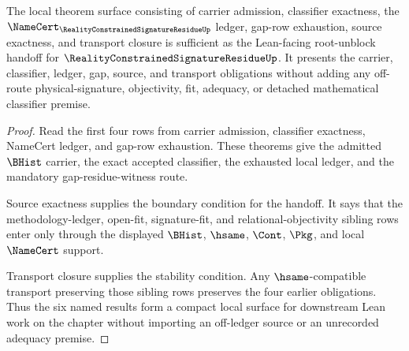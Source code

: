 \begin{theorem}
\label{thm:reality-constrained-signature-residue-lean-unblock-surface}
The local theorem surface consisting of carrier admission, classifier exactness,
the $\NameCert_{\RealityConstrainedSignatureResidueUp}$ ledger, gap-row
exhaustion, source exactness, and transport closure is sufficient as the
Lean-facing root-unblock handoff for
$\RealityConstrainedSignatureResidueUp$. It presents the carrier, classifier,
ledger, gap, source, and transport obligations without adding any off-route
physical-signature, objectivity, fit, adequacy, or detached mathematical
classifier premise.
\end{theorem}
\begin{proof}
Read the first four rows from carrier admission, classifier exactness, NameCert
ledger, and gap-row exhaustion. These theorems give the admitted $\BHist$
carrier, the exact accepted classifier, the exhausted local ledger, and the
mandatory gap-residue-witness route.

Source exactness supplies the boundary condition for the handoff. It says that
the methodology-ledger, open-fit, signature-fit, and relational-objectivity
sibling rows enter only through the displayed $\BHist$, $\hsame$, $\Cont$,
$\Pkg$, and local $\NameCert$ support.

Transport closure supplies the stability condition. Any $\hsame$-compatible
transport preserving those sibling rows preserves the four earlier obligations.
Thus the six named results form a compact local surface for downstream Lean
work on the chapter without importing an off-ledger source or an unrecorded
adequacy premise.
\end{proof}

